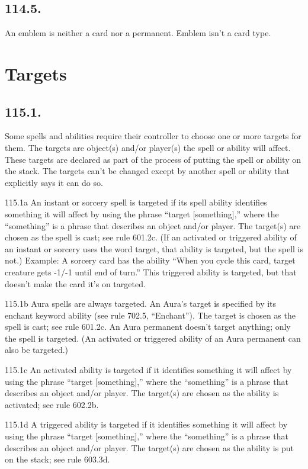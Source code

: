 \subsection*{114.5.}
An emblem is neither a card nor a permanent. Emblem isn’t a card type.

\section{Targets}
\subsection*{115.1.}
Some spells and abilities require their controller to choose one or more targets for them. The targets are object(s) and/or player(s) the spell or ability will affect. These targets are declared as part of the process of putting the spell or ability on the stack. The targets can’t be changed except by another spell or ability that explicitly says it can do so.

115.1a An instant or sorcery spell is targeted if its spell ability identifies something it will affect by using the phrase “target [something],” where the “something” is a phrase that describes an object and/or player. The target(s) are chosen as the spell is cast; see rule 601.2c. (If an activated or triggered ability of an instant or sorcery uses the word target, that ability is targeted, but the spell is not.)
Example: A sorcery card has the ability “When you cycle this card, target creature gets -1/-1 until end of turn.” This triggered ability is targeted, but that doesn’t make the card it’s on targeted.

115.1b Aura spells are always targeted. An Aura’s target is specified by its enchant keyword ability (see rule 702.5, “Enchant”). The target is chosen as the spell is cast; see rule 601.2c. An Aura permanent doesn’t target anything; only the spell is targeted. (An activated or triggered ability of an Aura permanent can also be targeted.)

115.1c An activated ability is targeted if it identifies something it will affect by using the phrase “target [something],” where the “something” is a phrase that describes an object and/or player. The target(s) are chosen as the ability is activated; see rule 602.2b.

115.1d A triggered ability is targeted if it identifies something it will affect by using the phrase “target [something],” where the “something” is a phrase that describes an object and/or player. The target(s) are chosen as the ability is put on the stack; see rule 603.3d.

